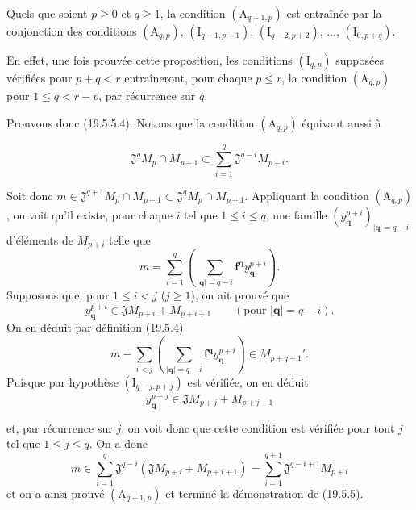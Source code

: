 \begin{env}[19.5.5.4]
\label{IV.19.5.5.4}
Quels que soient $p\geq0$ et $q\geq1$, la condition $(\mathrm A_{q+1,p})$ est entraînée par la conjonction des conditions $(\mathrm A_{q,p})$, $(\mathrm I_{q-1,p+1})$, $(\mathrm I_{q-2,p+2})$, $\ldots$, $(\mathrm I_{0,p+q})$.

En effet, une fois prouvée cette proposition, les conditions $(\mathrm I_{q,p})$ supposées vérifiées pour $p+q<r$ entraîneront, pour chaque $p\leq r$, la condition $(\mathrm A_{q,p})$ pour $1\leq q<r-p$, par récurrence sur $q$.

Prouvons donc (19.5.5.4). Notons que la condition $(\mathrm A_{q,p})$ équivaut aussi à
\end{env}

\begin{env}[19.5.5.5]
\label{IV.19.5.5.5}
\[
  \mathfrak J^qM_p\cap M_{p+1}\subset\sum_{i=1}^q\mathfrak J^{q-i}M_{p+i}.
\]

Soit donc $m\in\mathfrak J^{q+1}M_p\cap M_{p+1}\subset\mathfrak J^qM_p\cap M_{p+1}$. Appliquant la condition $(\mathrm A_{q,p})$, on voit qu'il existe, pour chaque $i$ tel que $1\leq i\leq q$, une famille $(y_{\mathbf q}^{p+i})_{|\mathbf q|=q-i}$ d'éléments de $M_{p+i}$ telle que
\[
  m=\sum_{i=1}^q\left(\sum_{|\mathbf q|=q-i}\mathbf f^{\mathbf q}y_{\mathbf q}^{p+i}\right).
\]
Supposons que, pour $1\leq i<j$ ($j\geq1$), on ait prouvé que
\[
  y_{\mathbf q}^{p+i}\in\mathfrak JM_{p+i}+M_{p+i+1}\qquad(\text{pour }|\mathbf q|=q-i).
\]
On en déduit par définition (19.5.4)
\[
  m-\sum_{i<j}\left(\sum_{|\mathbf q|=q-i}\mathbf f^{\mathbf q}y_{\mathbf q}^{p+i}\right)\in M_{p+q+1}'.
\]
Puisque par hypothèse $(\mathrm I_{q-j,p+j})$ est vérifiée, on en déduit
\[
  y_{\mathbf q}^{p+j}\in\mathfrak JM_{p+j}+M_{p+j+1}
\]


et, par récurrence sur $j$, on voit donc que cette condition est vérifiée pour tout $j$ tel que $1\leq j\leq q$. On a donc
\[
  m\in\sum_{i=1}^q\mathfrak J^{q-i}(\mathfrak JM_{p+i}+M_{p+i+1})=\sum_{i=1}^{q+1}\mathfrak J^{q-i+1}M_{p+i}
\]
et on a ainsi prouvé $(\mathrm A_{q+1,p})$ et terminé la démonstration de (19.5.5).
\end{env}

